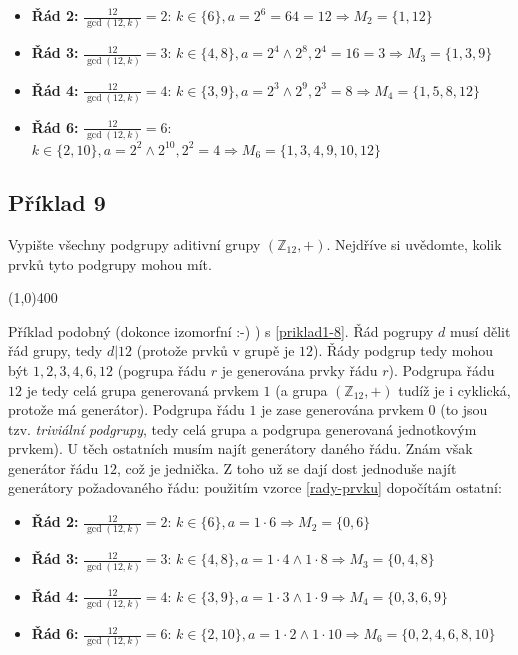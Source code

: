 \documentclass{article}
\begin{document}
\begin{itemize}
	\item \textbf{Řád 2:} $\frac{12}{\gcd(12, k)} = 2$: $k \in \{6\}, a = 2^6 = 64 = 12 \Rightarrow M_2 = \{1,12\}$
	\item \textbf{Řád 3:} $\frac{12}{\gcd(12, k)} = 3$: $k \in \{4,8\}, a = 2^4 \wedge 2^8, 2^4 = 16 = 3 \Rightarrow M_3 = \{1, 3, 9\}$
	\item \textbf{Řád 4:} $\frac{12}{\gcd(12, k)} = 4$: $k \in \{3,9\}, a = 2^3 \wedge 2^9, 2^3 = 8 \Rightarrow M_4 = \{1, 5, 8, 12\}$
	\item \textbf{Řád 6:} $\frac{12}{\gcd(12, k)} = 6$: $k \in \{2,10\}, a = 2^2 \wedge 2^{10}, 2^2 = 4 \Rightarrow M_6 = \{1, 3, 4, 9, 10, 12\}$
\end{itemize}  


\subsection{\label{priklad1-9}Příklad 9}
Vypište všechny podgrupy aditivní grupy $(\mathbb{Z}_{12},+)$. Nejdříve si uvědomte, kolik prvků tyto podgrupy mohou mít.

\line(1,0){400}

Příklad podobný (dokonce izomorfní :-) ) s \ref{priklad1-8}.
Řád pogrupy $d$ musí dělit řád grupy, tedy $d | 12$ (protože prvků v grupě je $12$). Řády podgrup tedy mohou být ${1,2,3,4,6,12}$ (pogrupa řádu $r$ je generována prvky řádu $r$). Podgrupa řádu $12$ je tedy celá grupa generovaná prvkem $1$ (a grupa $(\mathbb{Z}_{12},+)$ tudíž je i cyklická, protože má generátor). Podgrupa řádu $1$ je zase generována prvkem $0$ (to jsou tzv. \textit{triviální podgrupy}, tedy celá grupa a podgrupa generovaná jednotkovým prvkem). U těch ostatních musím najít generátory daného řádu. Znám však generátor řádu $12$, což je jednička. Z toho už se dají dost jednoduše najít generátory požadovaného řádu: použitím vzorce \ref{rady-prvku} dopočítám ostatní:

\begin{itemize}
	\item \textbf{Řád 2:} $\frac{12}{\gcd(12, k)} = 2$: $k \in \{6\}, a = 1 \cdot 6 \Rightarrow M_2 = \{0,6\}$
	\item \textbf{Řád 3:} $\frac{12}{\gcd(12, k)} = 3$: $k \in \{4,8\}, a = 1\cdot 4 \wedge 1 \cdot 8 \Rightarrow M_3 = \{0, 4, 8\}$
	\item \textbf{Řád 4:} $\frac{12}{\gcd(12, k)} = 4$: $k \in \{3,9\}, a = 1\cdot 3 \wedge 1\cdot 9 \Rightarrow M_4 = \{0, 3, 6, 9\}$
	\item \textbf{Řád 6:} $\frac{12}{\gcd(12, k)} = 6$: $k \in \{2,10\}, a = 1\cdot 2 \wedge 1 \cdot 10 \Rightarrow M_6 = \{0, 2, 4, 6, 8, 10\}$
\end{itemize}  
\end{document}
